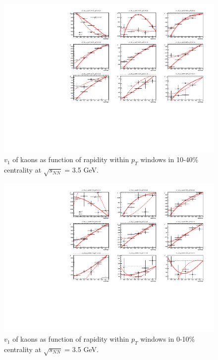 \begin{figure}[hbt!]
\centering
\includegraphics[width=0.85\linewidth]{figures/chapter03/3p5gev_kaonp_v1VSy_9pT_cent1.pdf}
\caption{$v_1$ of kaons as function of rapidity within $p_T$ windows in 10-40\% centrality at $\sqrt{s_{NN}}$ = 3.5 GeV.}
\label{fig:3p5gev_kaon_v1y_pt_cent1}
\end{figure}
    
\begin{figure}[hbt!]
\centering
\includegraphics[width=0.85\linewidth]{figures/chapter03/3p5gev_kaonp_v1VSy_9pT_cent2.pdf}
\caption{$v_1$ of kaons as function of rapidity within $p_T$ windows in 0-10\% centrality at $\sqrt{s_{NN}}$ = 3.5 GeV.}
\label{fig:3p5gev_kaon_v1y_pt_cent2}
\end{figure}

